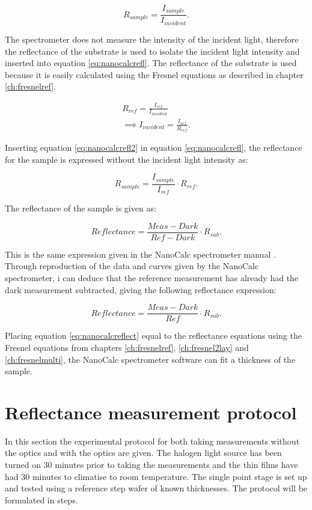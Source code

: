 \documentclass[MasterThesisMain.tex]{subfiles}
\begin{document}
\begin{equation}\label{eq:nanocalcrefl}
R_{sample} = \frac{I_{sample}}{I_{incident}}.
\end{equation}

The spectrometer does not measure the intensity of the incident light, therefore the reflectance of the substrate is used to isolate the incident light intensity and inserted into equation \ref{eq:nanocalcrefl}. The reflectance of the substrate is used because it is easily calculated using the Fresnel equations as described in chapter \ref{ch:fresnelref}.

\begin{align}
R_{ref} = \frac{I_{ref}}{I_{incident}}\\
\implies  I_{incident} = \frac{I_{ref}}{R_{ref}} \label{eq:nanocalcrefl2}.
\end{align}

Inserting equation \ref{eq:nanocalcrefl2} in equation \ref{eq:nanocalcrefl}, the reflectance for the sample is expressed without the incident light intensity as:

\begin{equation}
R_{sample} = \frac{I_{sample}}{I_{ref}} \cdot R_{ref}.
\end{equation}

The reflectance of the sample is given as:

\begin{equation}
Reflectance = \frac{Meas-Dark}{Ref-Dark} \cdot R_{sub}.
\end{equation}

This is the same expression given in the NanoCalc spectrometer manual \cite{nanocalcmanual}. Through reproduction of the data and curves given by the NanoCalc spectrometer, i can deduce that the reference measurement has already had the dark measurement subtracted, giving the following reflectance expression:

\begin{equation}\label{eq:nanocalcreflect}
Reflectance = \frac{Meas-Dark}{Ref} \cdot R_{sub}.
\end{equation}

Placing equation \ref{eq:nanocalcreflect} equal to the reflectance equations using the Fresnel equations from chapters  \ref{ch:fresnelref}, \ref{ch:fresnel2lay} and \ref{ch:fresnelmulti}, the NanoCalc spectrometer software can fit a thickness of the sample.


\section{Reflectance measurement protocol}
In this section the experimental protocol for both taking measurements without the optics and with the optics are given. The halogen light source has been turned on 30 minutes prior to taking the measurements and the thin films have had 30 minutes to climatise to room temperature. The single point stage is set up and tested using a reference step wafer of known thicknesses. The protocol will be formulated in steps.
\end{document}

